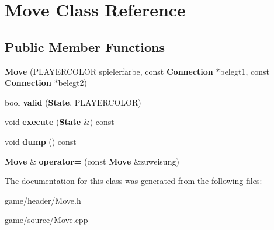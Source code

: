 \section{Move Class Reference}
\label{class_move}
\subsection*{Public Member Functions}
\begin{DoxyCompactItemize}
\item 
{\bfseries Move} (P\-L\-A\-Y\-E\-R\-C\-O\-L\-O\-R spielerfarbe, const {\bf Connection} $\ast$belegt1, const {\bf Connection} $\ast$belegt2)\label{class_move_a6040abbc43f535592305cb0c09b9be0a}

\item 
bool {\bfseries valid} ({\bf State}, P\-L\-A\-Y\-E\-R\-C\-O\-L\-O\-R)\label{class_move_a2651074156a1ab353be5f9b8c64649ee}

\item 
void {\bfseries execute} ({\bf State} \&) const \label{class_move_ae647057baca3c5d56261887a4eb2206f}

\item 
void {\bfseries dump} () const \label{class_move_a5fd65957977d9e30fd8898fa4a14ac56}

\item 
{\bf Move} \& {\bfseries operator=} (const {\bf Move} \&zuweisung)\label{class_move_a2cae41881447ddc9496cff2800ce01e2}

\end{DoxyCompactItemize}


The documentation for this class was generated from the following files\-:\begin{DoxyCompactItemize}
\item 
game/header/Move.\-h\item 
game/source/Move.\-cpp\end{DoxyCompactItemize}
